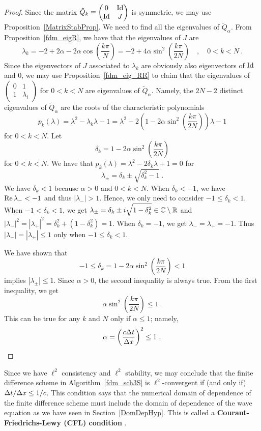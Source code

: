 \begin{proof}
Since the matrix $\displaystyle \tilde{Q}_k \equiv
\begin{pmatrix} 0 & \operatorname{Id} \\ \operatorname{Id} & J \end{pmatrix}$ is symmetric, we may
use Proposition~\ref{MatrixStabProp}.
We need to find all the eigenvalues of $\tilde{Q}_\alpha$.
From Proposition~\ref{fdm_eigR}, we have that the eigenvalues of $J$ are
\[
\lambda_k = -2 +2\alpha -2\alpha \cos\left(\frac{k\pi}{N}\right)
= -2 + 4 \alpha \sin^2\left(\frac{k\pi}{2N}\right)
\quad , \quad 0 < k < N \ .
\]
Since the eigenvectors of $J$ associated to $\lambda_k$ are obviously
also eigenvectors of $\operatorname{Id}$ and $0$, we may use
Proposition~\ref{fdm_eig_RR} to claim that the eigenvalues of
$\displaystyle \begin{pmatrix} 0 & 1 \\ 1 & \lambda_i\end{pmatrix}$
for $0 < k < N$ are eigenvalues of $\tilde{Q}_\alpha$.  Namely, the
$2N-2$ distinct eigenvalues of $\tilde{Q}_\alpha$ are the roots of the
characteristic polynomials
\[
p_k(\lambda) =  \lambda^2 -\lambda_k \lambda - 1
= \lambda^2 -2\left(1 - 2 \alpha \sin^2\left(\frac{k\pi}{2N}\right)
\right) \lambda - 1
\]
for $0 < k < N$.  Let
\[
  \delta_k = 1 - 2\alpha \sin^2\left( \frac{k \pi}{2N} \right)
\]
for $0 < k < N$.  
We have that $p_k(\lambda) = \lambda^2 -2 \delta_k \lambda + 1 = 0$
for
\[
\lambda_{\pm} = \delta_k \pm \sqrt{\delta_k^2 - 1} \ .
\]
We have $\delta_k < 1$ because $\alpha>0$ and $0<k<N$.
When $\delta_k<-1$, we have
$\operatorname{Re} \lambda_{-} < -1$ and thus $|\lambda_{-}|>1$.  Hence, we only need to
consider $-1 \leq \delta_k < 1$.  When $-1 < \delta_k < 1$, we get
$\displaystyle
\lambda_\pm = \delta_k \pm i\sqrt{1 - \delta_k^2} \in \mathbb{C} \setminus \mathbb{R}$
and
$\displaystyle |\lambda_{-}|^2 = |\lambda_{+}|^2
= \delta_k^2 + ( 1 - \delta_k^2) = 1$.
When $\delta_k = -1$, we get $\lambda_{-} = \lambda_{+} = - 1$.  Thus
$|\lambda_{-}| = |\lambda_{+}| \leq 1$ only when $-1 \leq \delta_k < 1$.

We have shown that
\[
-1 \leq \delta_k = 1 -2 \alpha \sin^2\left( \frac{k \pi}{2N}\right) < 1
\]
implies $|\lambda_{\pm}|\leq 1$.  Since $\alpha >0$, the second
inequality is always true. From the first inequality, we get
\[
\alpha \sin^2\left( \frac{k \pi}{2N} \right) \leq 1 \ .
\]
This can be true for any $k$ and $N$ only if $\alpha \leq 1$;
namely,
\[
\alpha = \left( \frac{c \Delta{t}}{\Delta{x}}\right)^2 \leq 1 \ .
\]
\end{proof}

Since we have $\ell^2$ consistency and $\ell^2$ stability, we may
conclude that the finite difference scheme in
Algorithm~\ref{fdm_sch3S} is $\ell^2$-convergent if (and only if) 
$\Delta{t} / \Delta{x} \leq 1/c$.
This condition says that the numerical domain of dependence of the
finite difference scheme must include the domain of dependence of the
wave equation as we have seen in Section~\ref{DomDepHyp}.
This is called a {\bfseries Courant-Friedrichs-Lewy (CFL)
condition}
.

